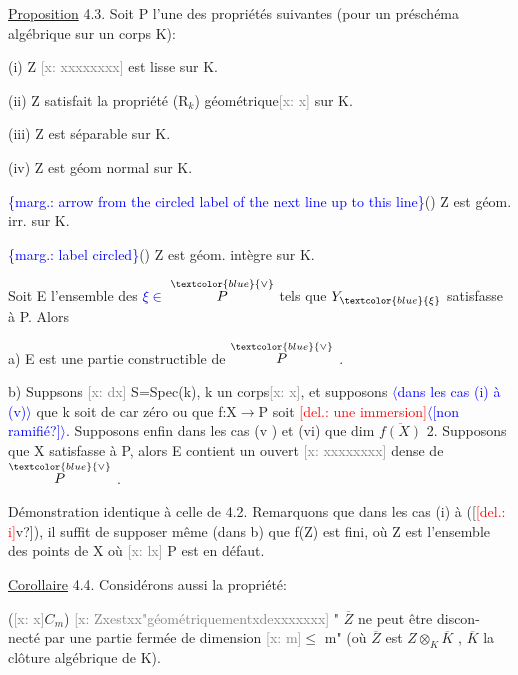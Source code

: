 \documentclass[11pt]{article}
\newcommand{\scanpage}[1]{\par\bigskip\noindent{\small\sffamily[scan #1]}\par}
\newcommand{\mspage}[1]{{\small\sffamily[p.\,#1]}}
\newcommand{\hand}[1]{\textcolor{blue}{#1}}
\let\over\relax
\newcommand{\over}[2]{\textcolor{gray}{#1}\textcolor{blue}{\ensuremath{^{\!\nearrow}}#2}}
\newcommand{\inserted}[2][]{\textcolor{blue}{$\langle$#2$\rangle$}}
\newcommand{\margin}[1]{\textcolor{blue}{\{\textsf{marg.:} #1\}}}
\newcommand{\deleted}[1]{\textcolor{red}{[\textsf{del.:} #1]}}
\newcommand{\xout}[1]{\textcolor{gray}{[\textsf{x:} #1]}}
\newcommand{\uline}[1]{\underline{#1}}
\newcommand{\unsure}[1]{[#1?]}
\begin{document}
\mspage{19}

\clearpage
\scanpage{25/20}
\mspage{17}

\uline{Proposition} 4.3.    Soit P l'une des propriétés  suivantes (pour un
préschéma algébrique sur un corps K):

(i)  Z \xout{xxxxxxxx} est lisse sur K.

(ii)  Z satisfait la propriété (R$_k$) géométrique\xout{x} sur K.

(iii)  Z est séparable sur K.

(iv)  Z est géom normal sur K.

\margin{arrow from the circled label of the next line up to this line}(\over{v}{\unsure{vi|v}})  Z  est géom. irr.  sur K.

\margin{label circled}(\over{vi}{\unsure{v|vi}})  Z est géom. intègre  sur K.

Soit E l'ensemble des \hand{$\xi \in$} $\overset{\hand{\vee}}{P}$  tels que $Y_{\hand{\xi}}$ satisfasse à P. Alors

a)  E est une partie constructible de $\overset{\hand{\vee}}{P}$ .

b)  Supp\over{x}{o}sons \xout{dx} S=Spec(k), k un corps\xout{x}, et supposons \inserted{dans les cas (i) à (v)} que k soit de
car zéro  ou que f:X$\rightarrow$P  soit \deleted{une immersion}\inserted{\unsure{non ramifié}}. Supposons enfin dans les
cas (v ) et (vi)  que dim $\overline{f(X)}$ \over{$>$}{$\geqslant$} 2.  Supposons que X satisfasse à P,
alors E contient un ouvert \xout{xxxxxxxx} dense de $\overset{\hand{\vee}}{P}$ .

Démonstration identique à celle de 4.2.   Remarquons que dans
les cas (i) à (\unsure{\deleted{i}v}), il suffit de supposer même (dans b) que  f(Z) est
fini, où Z est l'ensemble des points de X où \xout{lx} P est en défaut.

\uline{Corollaire} 4.4.    Considérons aussi la propriété:

(\xout{x}$C_m$)  \xout{Zxestxx"géométriquementxdexxxxxxx} " $\overline{Z}$ ne peut être discon-%
necté par une partie fermée de dimension  \xout{m}$\leqslant$ m" (où $\overline{Z}$ est $Z\otimes_K\overline{K}$ , $\overline{K}$
la clôture  algébrique de K).
\end{document}
